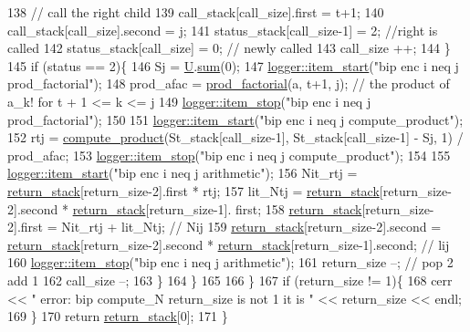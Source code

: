 \begin{DoxyCode}
138         \textcolor{comment}{// call the right child}
139         call\_stack[call\_size].first = t+1;
140         call\_stack[call\_size].second = j;
141         status\_stack[call\_size-1] = 2; \textcolor{comment}{//right is called}
142         status\_stack[call\_size] = 0;  \textcolor{comment}{// newly called}
143         call\_size ++;
144       \}
145       \textcolor{keywordflow}{if} (status == 2)\{
146         Sj = \hyperlink{classb__graph__encoder_ac810138443002a2b2cf579ced2dc34ce}{U}.\hyperlink{classreverse__fenwick__tree_a672731fd6395b4853430073a099a80e6}{sum}(0);
147         \hyperlink{classlogger_a7e21ec6ad2d40cfc2c6a383521b5641a}{logger::item\_start}(\textcolor{stringliteral}{"bip enc i neq j prod\_factorial"});
148         prod\_afac = \hyperlink{compression__helper_8cpp_a86d8a20e022dc06b23df3b08ac10b7d1}{prod\_factorial}(a, t+1, j); \textcolor{comment}{// the product of a\_k! for t + 1 <= k <= j}
149         \hyperlink{classlogger_a6775fee9681c437fc9c05d71cfbbe4a2}{logger::item\_stop}(\textcolor{stringliteral}{"bip enc i neq j prod\_factorial"});
150 
151         \hyperlink{classlogger_a7e21ec6ad2d40cfc2c6a383521b5641a}{logger::item\_start}(\textcolor{stringliteral}{"bip enc i neq j compute\_product"});
152         rtj = \hyperlink{compression__helper_8cpp_ae2afb43aabe50f7d42aae8f82b5a35f4}{compute\_product}(St\_stack[call\_size-1], St\_stack[call\_size-1] - Sj, 1) / 
      prod\_afac;
153         \hyperlink{classlogger_a6775fee9681c437fc9c05d71cfbbe4a2}{logger::item\_stop}(\textcolor{stringliteral}{"bip enc i neq j compute\_product"});
154 
155         \hyperlink{classlogger_a7e21ec6ad2d40cfc2c6a383521b5641a}{logger::item\_start}(\textcolor{stringliteral}{"bip enc i neq j arithmetic"});
156         Nit\_rtj = \hyperlink{namespacehelper__vars_a6d2100c373830cacd232319a9958652d}{return\_stack}[return\_size-2].first * rtj;
157         lit\_Ntj = \hyperlink{namespacehelper__vars_a6d2100c373830cacd232319a9958652d}{return\_stack}[return\_size-2].second * \hyperlink{namespacehelper__vars_a6d2100c373830cacd232319a9958652d}{return\_stack}[return\_size-1].
      first;
158         \hyperlink{namespacehelper__vars_a6d2100c373830cacd232319a9958652d}{return\_stack}[return\_size-2].first = Nit\_rtj + lit\_Ntj; \textcolor{comment}{// Nij}
159         \hyperlink{namespacehelper__vars_a6d2100c373830cacd232319a9958652d}{return\_stack}[return\_size-2].second = \hyperlink{namespacehelper__vars_a6d2100c373830cacd232319a9958652d}{return\_stack}[return\_size-2].second * 
      \hyperlink{namespacehelper__vars_a6d2100c373830cacd232319a9958652d}{return\_stack}[return\_size-1].second; \textcolor{comment}{// lij}
160         \hyperlink{classlogger_a6775fee9681c437fc9c05d71cfbbe4a2}{logger::item\_stop}(\textcolor{stringliteral}{"bip enc i neq j arithmetic"});
161         return\_size --; \textcolor{comment}{// pop 2 add 1}
162         call\_size --;
163       \}
164     \}
165 
166   \}
167   \textcolor{keywordflow}{if} (return\_size != 1)\{
168     cerr << \textcolor{stringliteral}{" error: bip compute\_N return\_size is not 1 it is "} << return\_size << endl;
169   \}
170   \textcolor{keywordflow}{return} \hyperlink{namespacehelper__vars_a6d2100c373830cacd232319a9958652d}{return\_stack}[0];
171 \}
\end{DoxyCode}
